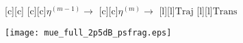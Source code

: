 \documentclass{article}
\begin{document}
\begin{figure}[htb]
  \begin{center}

        [c][c]{}
        [c][c]{$\eta^{(m-1)} \rightarrow$}
        [c][c]{$\eta^{(m)} \rightarrow$}
        [l][l]{$\mathrm{Traj}$}
        [l][l]{$\mathrm{Trans}$}
	

    \texttt{[image: mue\_full\_2p5dB\_psfrag.eps]}
    \end{center}
\end{figure}
\end{document}
